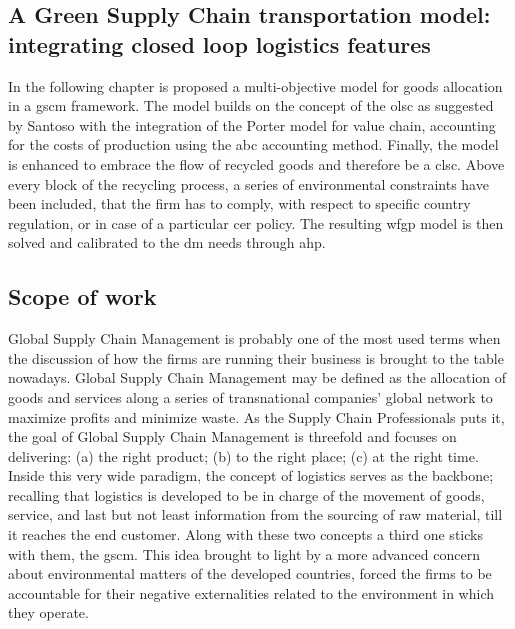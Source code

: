 \begin{doublespace}
\chapter{A Green Supply Chain transportation model: integrating closed loop logistics features}
In the following chapter is proposed a multi-objective model for goods allocation in a \gls{gscm} framework. The model builds on the concept of the \gls{olsc} as suggested by Santoso with the integration of the Porter model for value chain, accounting for the costs of production using the \gls{abc} accounting method. Finally, the model is enhanced to embrace the flow of recycled goods and therefore be a \gls{clsc}. Above every block of the recycling process, a series of environmental constraints have been included, that the firm has to comply, with respect to specific country regulation, or in case of a particular \gls{cer} policy. The resulting \gls{wfgp} model is then solved and calibrated to the \gls{dm} needs through \gls{ahp}.

\section{Scope of work}
Global Supply Chain Management is probably one of the most used terms when the discussion of how the firms are running their business is brought to the table nowadays. Global Supply Chain Management may be defined as the allocation of goods and services along a series of transnational companies' global network to maximize profits and minimize waste. As the Supply Chain Professionals puts it, the goal of Global Supply Chain Management is threefold and focuses on delivering: (a) the right product; (b) to the right place; (c) at the right time.
   Inside this very wide paradigm, the concept of logistics serves as the backbone; recalling that logistics is developed to be in charge of the movement of goods, service, and last but not least information from the sourcing of raw material, till it reaches the end customer.
   Along with these two concepts a third one sticks with them, the \gls{gscm}. This idea brought to light by a more advanced concern about environmental matters of the developed countries, forced the firms to be accountable for their negative externalities related to the environment in which they operate\cite{Srivastava2007}.


\end{doublespace}
